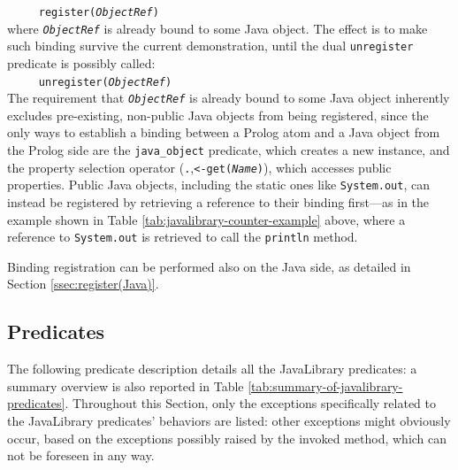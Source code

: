 \texttt{~~~~~register(\textit{ObjectRef})}\\

\noindent where \texttt{\textit{ObjectRef}} is already bound to some Java object. The effect is to make such binding survive the current demonstration, until the dual \texttt{unregister} predicate is possibly called:\\

\texttt{~~~~~unregister(\textit{ObjectRef})}\\

\noindent The requirement that \texttt{\textit{ObjectRef}} is already bound to some Java object inherently excludes pre-existing, non-public Java objects from being registered, since the only ways to establish a binding between a Prolog atom and a Java object from the Prolog side are the \texttt{java\_object} predicate, which creates a new instance, and the property selection operator (\texttt{.},\texttt{<-get(\textit{Name})}), which accesses public properties.
%
Public Java objects, including the static ones like \texttt{System.out}, can instead be registered by retrieving a reference to their binding first---as in the example shown in Table \ref{tab:javalibrary-counter-example} above, where a reference to \texttt{System.out} is retrieved to call the \texttt{println} method.

\normalcolor
Binding registration can be performed also on the Java side, as detailed in Section \ref{ssec:register(Java)}.

\subsection{Predicates}
\label{ssec:all-javalibrary-predicates}

The following predicate description details all the JavaLibrary predicates: a summary overview is also reported in Table \ref{tab:summary-of-javalibrary-predicates}.
%
Throughout this Section, only the exceptions specifically related to the JavaLibrary predicates' behaviors are listed: other exceptions might obviously occur, based on the exceptions possibly raised by the invoked method, which can not be foreseen in any way.

